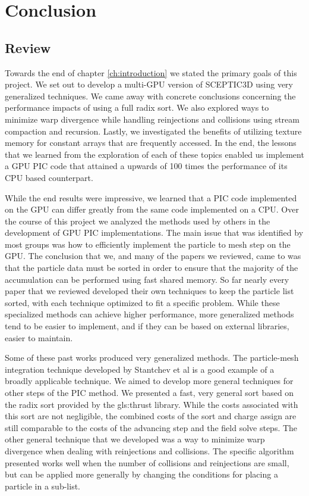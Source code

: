 \chapter{Conclusion}

\section{Review}
Towards the end of chapter \ref{ch:introduction} we stated the primary goals of this project. We set out to develop a multi-GPU version of SCEPTIC3D using very generalized techniques. We came away with concrete conclusions concerning the performance impacts of using a full radix sort. We also explored ways to minimize warp divergence while handling reinjections and collisions using stream compaction and recursion. Lastly, we investigated the benefits of utilizing texture memory for constant arrays that are frequently accessed. In the end, the lessons that we learned from the exploration of each of these topics enabled us implement a GPU PIC code that attained a upwards of 100 times the performance of its CPU based counterpart. 

While the end results were impressive, we learned that a PIC code implemented on the GPU can differ greatly from the same code implemented on a CPU. Over the course of this project we analyzed the methods used by others in the development of GPU PIC implementations. The main issue that was identified by most groups was how to efficiently implement the particle to mesh step on the GPU. The conclusion that we, and many of the papers we reviewed, came to was that the particle data must be sorted in order to ensure that the majority of the accumulation can be performed using fast shared memory. So far nearly every paper that we reviewed developed their own techniques to keep the particle list sorted, with each technique optimized to fit a specific problem. 
While these specialized methods can achieve higher performance, more generalized methods tend to be easier to implement, and if they can be based on external libraries, easier to maintain. 

Some of these past works produced very generalized methods. The particle-mesh integration technique developed by Stantchev et al is a good example of a broadly applicable technique. We aimed to develop more general techniques for other steps of the PIC method. We presented a fast, very general sort based on the radix sort provided by the \gls{gls:thrust} library. While the costs associated with this sort are not negligible, the combined costs of the sort and charge assign are still comparable to the costs of the advancing step and the field solve steps. The other general technique that we developed was a way to minimize warp divergence when dealing with reinjections and collisions. The specific algorithm presented works well when the number of collisions and reinjections are small, but can be applied more generally by changing the conditions for placing a particle in a sub-list. 


